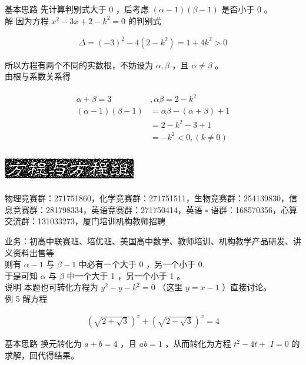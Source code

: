 \documentclass[10pt]{article}
\begin{document}
基本思路 先计算判别式大于 0 ，后考虑 $(\alpha-1)(\beta-1)$ 是否小于 0 。\\
解 因为方程 $x^{2}-3 x+2-k^{2}=0$ 的判别式

\begin{align*}
\Delta=(-3)^{2}-4\left(2-k^{2}\right)=1+4 k^{2}>0
\end{align*}

所以方程有两个不同的实数根，不妨设为 $\alpha, \beta$ ，且 $\alpha \neq \beta$ 。\\
由根与系数关系得

\begin{align*}
\begin{aligned}
\alpha+\beta=3 & , \alpha \beta=2-k^{2} \\
(\alpha-1)(\beta-1) & =\alpha \beta-(\alpha+\beta)+1 \\
& =2-k^{2}-3+1 \\
& =-k^{2}<0,(k \neq 0)
\end{aligned}
\end{align*}

\begin{center}
\includegraphics[max width=\textwidth]{2024_10_30_26b590fd1106d28139f0g-064}
\end{center}

物理竞赛群：271751860，化学竞赛群：271751511，生物竞赛群：254139830，信息竞赛群：281798334，英语竞赛群：271750414，英语 $\square$ 语群：168570356，心算交流群：131033273，厦门培训机构教师招聘

业务：初高中联赛班、培优班、美国高中数学、教师培训、机构教学产品研发、讲义资料出售等\\
则有 $\alpha-1$ 与 $\beta-1$ 中必有一个大于 0 ，另一个小于 0.\\
于是可知 $\alpha$ 与 $\beta$ 中一个大于 1 ，另一个小于 1 。\\
说明 本题也可转化方程为 $y^{2}-y-k^{2}=0$ （这里 $y=x-1$ ）直接讨论。\\
例 5 解方程

\begin{align*}
(\sqrt{2+\sqrt{3}})^{x}+(\sqrt{2-\sqrt{3}})^{x}=4
\end{align*}

基本思路 换元转化为 $a+b=4$ ，且 $a b=1$ ，从而转化为方程 $t^{2}-4 t+$ $I=0$ 的求解，回代得结果。
\end{document}

